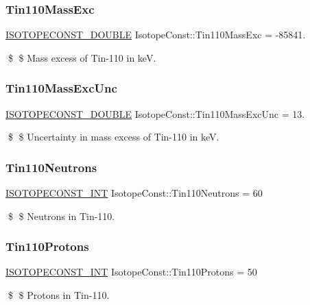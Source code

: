 \subsubsection{\texorpdfstring{Tin110\+Mass\+Exc}{Tin110MassExc}}
{\footnotesize\ttfamily \mbox{\hyperlink{group___isotope_const-_macros_ga8f45a7272ce02c0b4c65c44636ed719a}{I\+S\+O\+T\+O\+P\+E\+C\+O\+N\+S\+T\+\_\+\+D\+O\+U\+B\+LE}} Isotope\+Const\+::\+Tin110\+Mass\+Exc = -\/85841.}

\$ \$ Mass excess of Tin-\/110 in keV. \mbox{\label{group___isotope_const-_tin-_sn110_ga858132e576ce9a8b1d707f02c0429fac}} 
\subsubsection{\texorpdfstring{Tin110\+Mass\+Exc\+Unc}{Tin110MassExcUnc}}
{\footnotesize\ttfamily \mbox{\hyperlink{group___isotope_const-_macros_ga8f45a7272ce02c0b4c65c44636ed719a}{I\+S\+O\+T\+O\+P\+E\+C\+O\+N\+S\+T\+\_\+\+D\+O\+U\+B\+LE}} Isotope\+Const\+::\+Tin110\+Mass\+Exc\+Unc = 13.}

\$ \$ Uncertainty in mass excess of Tin-\/110 in keV. \mbox{\label{group___isotope_const-_tin-_sn110_ga7c611ed2d4f660d4dc0a004a39812d69}} 
\subsubsection{\texorpdfstring{Tin110\+Neutrons}{Tin110Neutrons}}
{\footnotesize\ttfamily \mbox{\hyperlink{group___isotope_const-_macros_ga5f18360b3e99483a35c32d789e62621c}{I\+S\+O\+T\+O\+P\+E\+C\+O\+N\+S\+T\+\_\+\+I\+NT}} Isotope\+Const\+::\+Tin110\+Neutrons = 60}

\$ \$ Neutrons in Tin-\/110. \mbox{\label{group___isotope_const-_tin-_sn110_gacfbfe5599c213fd7b456be903cb041c4}} 
\subsubsection{\texorpdfstring{Tin110\+Protons}{Tin110Protons}}
{\footnotesize\ttfamily \mbox{\hyperlink{group___isotope_const-_macros_ga5f18360b3e99483a35c32d789e62621c}{I\+S\+O\+T\+O\+P\+E\+C\+O\+N\+S\+T\+\_\+\+I\+NT}} Isotope\+Const\+::\+Tin110\+Protons = 50}

\$ \$ Protons in Tin-\/110. 